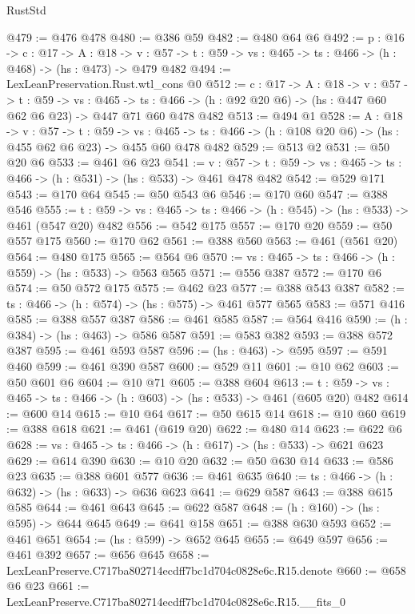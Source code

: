 \begin{lexlean}{RustStd}
\begin{coremodule}
@479 := @476 @478
@480 := @386 @59
@482 := @480 @64 @6
@492 := {p : @16} ->
  {c : @17} ->
  {A : @18} ->
  {v : @57} -> {t : @59} -> {vs : @465} -> {ts : @466} -> (h : @468) -> (hs : @473) -> @479 @482
@494 := LexLeanPreservation.Rust.wtl_cons @0
@512 := {c : @17} ->
  {A : @18} ->
  {v : @57} ->
  {t : @59} ->
  {vs : @465} ->
  {ts : @466} -> (h : @92 @20 @6) -> (hs : @447 @60 @62 @6 @23) -> @447 @71 @60 @478 @482
@513 := @494 @1
@528 := {A : @18} ->
  {v : @57} ->
  {t : @59} ->
  {vs : @465} -> {ts : @466} -> (h : @108 @20 @6) -> (hs : @455 @62 @6 @23) -> @455 @60 @478 @482
@529 := @513 @2
@531 := @50 @20 @6
@533 := @461 @6 @23
@541 := {v : @57} ->
  {t : @59} -> {vs : @465} -> {ts : @466} -> (h : @531) -> (hs : @533) -> @461 @478 @482
@542 := @529 @171
@543 := @170 @64
@545 := @50 @543 @6
@546 := @170 @60
@547 := @388 @546
@555 := {t : @59} -> {vs : @465} -> {ts : @466} -> (h : @545) -> (hs : @533) -> @461 (@547 @20) @482
@556 := @542 @175
@557 := @170 @20
@559 := @50 @557 @175
@560 := @170 @62
@561 := @388 @560
@563 := @461 (@561 @20)
@564 := @480 @175
@565 := @564 @6
@570 := {vs : @465} -> {ts : @466} -> (h : @559) -> (hs : @533) -> @563 @565
@571 := @556 @387
@572 := @170 @6
@574 := @50 @572 @175
@575 := @462 @23
@577 := @388 @543 @387
@582 := {ts : @466} -> (h : @574) -> (hs : @575) -> @461 @577 @565
@583 := @571 @416
@585 := @388 @557 @387
@586 := @461 @585
@587 := @564 @416
@590 := (h : @384) -> (hs : @463) -> @586 @587
@591 := @583 @382
@593 := @388 @572 @387
@595 := @461 @593 @587
@596 := (hs : @463) -> @595
@597 := @591 @460
@599 := @461 @390 @587
@600 := @529 @11
@601 := @10 @62
@603 := @50 @601 @6
@604 := @10 @71
@605 := @388 @604
@613 := {t : @59} -> {vs : @465} -> {ts : @466} -> (h : @603) -> (hs : @533) -> @461 (@605 @20) @482
@614 := @600 @14
@615 := @10 @64
@617 := @50 @615 @14
@618 := @10 @60
@619 := @388 @618
@621 := @461 (@619 @20)
@622 := @480 @14
@623 := @622 @6
@628 := {vs : @465} -> {ts : @466} -> (h : @617) -> (hs : @533) -> @621 @623
@629 := @614 @390
@630 := @10 @20
@632 := @50 @630 @14
@633 := @586 @23
@635 := @388 @601 @577
@636 := @461 @635
@640 := {ts : @466} -> (h : @632) -> (hs : @633) -> @636 @623
@641 := @629 @587
@643 := @388 @615 @585
@644 := @461 @643
@645 := @622 @587
@648 := (h : @160) -> (hs : @595) -> @644 @645
@649 := @641 @158
@651 := @388 @630 @593
@652 := @461 @651
@654 := (hs : @599) -> @652 @645
@655 := @649 @597
@656 := @461 @392
@657 := @656 @645
@658 := LexLeanPreserve.C717ba802714ecdff7bc1d704c0828e6c.R15.denote
@660 := @658 @6 @23
@661 := LexLeanPreserve.C717ba802714ecdff7bc1d704c0828e6c.R15.__fits_0

\end{coremodule}
\end{lexlean}
